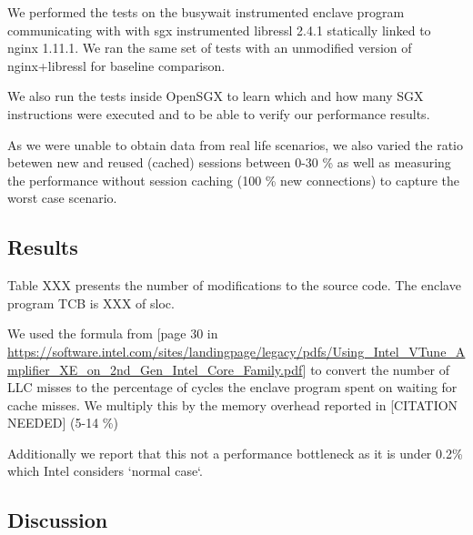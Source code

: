 \documentclass[../main.tex]{subfiles}
\begin{document}
We performed the tests on the busywait instrumented enclave program
communicating with with sgx instrumented libressl 2.4.1 statically
linked to nginx 1.11.1. We ran the same set of tests with an
unmodified version of nginx+libressl for baseline comparison.

We also run the tests inside OpenSGX to learn which and how many SGX
instructions were executed and to be able to verify our performance
results.

As we were unable to obtain data from real life scenarios, we also
varied the ratio betewen new and reused (cached) sessions between 0-30
\% as well as measuring the performance without session caching (100
\% new connections) to capture the worst case scenario.

\subsection{Results}

Table XXX presents the number of modifications to the source code. The
enclave program TCB is XXX of sloc.

We used the formula from [page 30 in
\url{https://software.intel.com/sites/landingpage/legacy/pdfs/Using_Intel_VTune_Amplifier_XE_on_2nd_Gen_Intel_Core_Family.pdf}]
to convert the number of LLC misses to the percentage of cycles the
enclave program spent on waiting for cache misses. We multiply this by
the memory overhead reported in [CITATION NEEDED] (5-14 \%)

Additionally we report that this not a performance bottleneck as it is
under 0.2\% which Intel considers `normal case`.

\begin{table}[H]
\end{table}


\subsection{Discussion}
\end{document}
